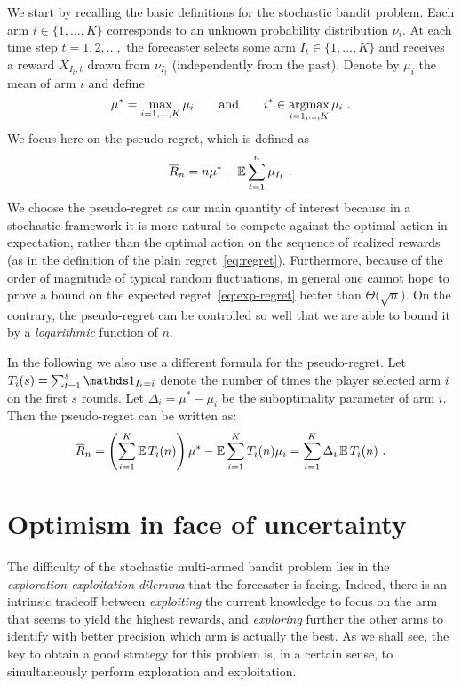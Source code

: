 We start by recalling the basic definitions for the stochastic bandit problem. Each arm $i \in \{1, \hdots, K\}$ corresponds to an unknown probability distribution $\nu_i$. At each time step $t =1, 2, \hdots,$ the forecaster selects some arm $I_t \in \{1, \hdots, K\}$ and receives a reward $X_{I_t,t}$ drawn from $\nu_{I_t}$ (independently from the past). Denote by $\mu_i$ the mean of arm $i$ and define
\[
    \mu^*=\max_{i=1,\hdots,K} \mu_i \qquad\text{and}\qquad i^* \in \mathop{\mathrm{argmax}}_{i=1,\hdots,K} \mu_i~.
\]
We focus here on the pseudo-regret, which is defined as
\begin{equation} \label{eq:pseudoregretstocha}
\overline{R}_n = n \mu^* - \mathbb{E} \sum_{t=1}^n \mu_{I_t}~.
\end{equation}
We choose the pseudo-regret as our main quantity of interest because in a stochastic framework it is more natural to compete against the optimal action in expectation, rather than the optimal action on the sequence of realized rewards (as in the definition of the plain regret~\eqref{eq:regret}). Furthermore, because of the order of magnitude of typical random fluctuations, in general one cannot hope to prove a bound on the expected regret~\eqref{eq:exp-regret} better than $\Theta\bigl(\sqrt{n}\bigr)$. On the contrary, the pseudo-regret can be controlled so well that we are able to bound it by a \textsl{logarithmic} function of $n$.

In the following we also use a different formula for the pseudo-regret. Let $T_{i}(s)=\sum_{t=1}^s \ds1_{I_t=i}$ denote the number of times the player selected arm $i$ on the first $s$ rounds. Let $\Delta_i = \mu^*-\mu_i$ be the suboptimality parameter of arm $i$. Then the pseudo-regret can be written as:
\begin{align*}
\overline{R}_n =
\left( \sum_{i=1}^K \mathbb{E}\,T_i(n) \right) \mu^* - \mathbb{E} \sum_{i=1}^K T_i(n) \mu_i = \sum_{i=1}^K \Delta_i\, \mathbb{E}\,T_i(n)~.
\end{align*}

\section{Optimism in face of uncertainty}
The difficulty of the stochastic multi-armed bandit problem lies in the {\em exploration-exploitation dilemma} that the forecaster is facing. Indeed, there is an intrinsic tradeoff between {\em exploiting} the current knowledge to focus on the arm that seems to yield the highest rewards, and {\em exploring} further the other arms to identify with better precision which arm is actually the best. As we shall see, the key to obtain a good strategy for this problem is, in a certain sense, to simultaneously perform exploration and exploitation.

